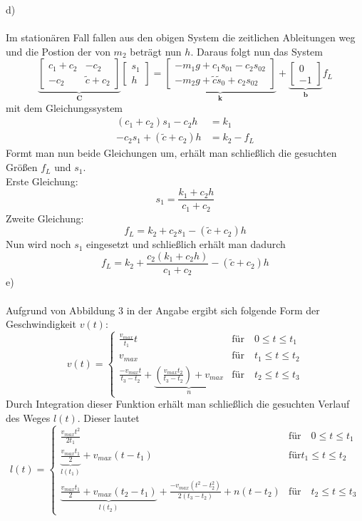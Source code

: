 d)\\ \\
Im stationären Fall fallen aus den obigen System die zeitlichen Ableitungen weg und die Postion der von $m_2$ beträgt nun $h$. Daraus folgt nun das System
\[
	\underbrace{\begin{bmatrix}
		c_1 + c_2 & -c_2 \\
		-c_2 & \tilde{c} + c_2
		\end{bmatrix}}_{\textbf{C}}
	\begin{bmatrix}
		s_1 \\
		h
	\end{bmatrix}
	=
	\underbrace{\begin{bmatrix}
		-m_1g + c_1s_{01} - c_2s_{02} \\
		-m_2g + \tilde{c}\tilde{s}_0 + c_2s_{02}
		\end{bmatrix}}_{\textbf{k}}
	+ 
	\underbrace{\begin{bmatrix}
		0 \\
		-1
		\end{bmatrix}}_{\textbf{b}} f_L
\]
mit dem Gleichungssystem
\begin{align*}
	(c_1 + c_2)s_1 - c_2 h &= k_1 \\
	-c_2 s_1 + (\tilde{c} + c_2) h &= k_2 - f_L
\end{align*}
\newpage
\noindent
Formt man nun beide Gleichungen um, erhält man schließlich die gesuchten Größen $f_L$ und $s_1$.\\
Erste Gleichung:
\[
	s_1 = \frac{k_1 + c_2 h }{c_1 + c_2}
\]
Zweite Gleichung:
\[
	f_L = k_2 + c_2 s_1 - (\tilde{c} + c_2)h
\]
Nun wird noch $s_1$ eingesetzt und schließlich erhält man dadurch
\[
	f_L = k_2 + \frac{c_2 (k_1 + c_2 h) }{c_1 + c_2} - (\tilde{c} + c_2)h
\]
e) \\ \\
Aufgrund von Abbildung 3 in der Angabe ergibt sich folgende Form der Geschwindigkeit $v(t)$:
\[
	v(t) = \left\{
		\begin{array}{lll}
			\frac{v_{max}}{t_1}t & \text{für} \quad 0 \leq t \leq t_1 \\
			v_{max} & \text{für} \quad t_1 \leq t \leq t_2 \\
			\frac{-v_{max} t }{t_3 - t_2} + \underbrace{\left(\frac{v_{max}t_2}{t_3 - t_2}\right) + v_{max}}_{n} & \text{für} \quad t_2 \leq t \leq t_3
		\end{array}
		\right.
\]
Durch Integration dieser Funktion erhält man schließlich die gesuchten Verlauf des Weges $l(t)$. Dieser lautet
\[
	l(t) = \left\{
		\begin{array}{lll}
			\frac{v_{max}t^2}{2t_1} & \text{für} \quad 0 \leq t \leq t_1 \\
			\underbrace{\frac{v_{max}t_1}{2}}_{l(t_1)} + v_{max}(t - t_1) & \text{für} t_1 \leq t \leq t_2 \\
			\underbrace{\frac{v_{max}t_1}{2} + v_{max}(t_2 - t_1)}_{l(t_2)} + \frac{-v_{max}(t^2 - t_2^2)}{2(t_3 - t_2)} + n(t - t_2) & \text{für} \quad t_2 \leq t \leq t_3
		\end{array}
	\right.
\]

